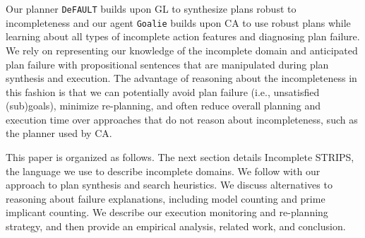 \documentclass{article}
\def\FFRISKY{{\tt DeFAULT}}
\def\goalie{{\tt Goalie}}
\begin{document}
Our planner \FFRISKY{} builds upon GL to synthesize plans robust to incompleteness and our agent \goalie{} builds upon CA to use robust plans while learning about all types of incomplete action features and diagnosing plan failure.  We rely on representing our knowledge of the incomplete domain and anticipated plan failure with propositional sentences that are manipulated during plan synthesis and execution.  The advantage of reasoning about the incompleteness in this fashion is that we can potentially avoid plan failure (i.e., unsatisfied (sub)goals), minimize re-planning, and often reduce overall planning and execution time over approaches that do not reason about incompleteness, such as the planner used by CA.  

This paper is organized as follows.  The next section details Incomplete STRIPS, the language we use to describe incomplete domains.  We follow with our approach to plan synthesis and search heuristics.  We discuss alternatives to reasoning about failure explanations, including model counting and prime implicant counting.  We describe our execution monitoring and re-planning strategy, and then provide an empirical analysis, related work, and conclusion.
  
\end{document}
